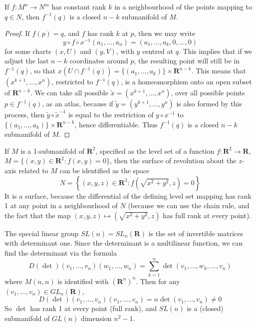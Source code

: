 \begin{theorem}
    If $f: M^n \to N^m$ has constant rank $k$ in a neighbourhood of the points mapping to $q \in N$, then $f^{-1}(q)$ is a closed $n - k$ submanifold of $M$.
\end{theorem}
\begin{proof}
    If $f(p) = q$, and $f$ has rank $k$ at $p$, then we may write
    \[ y \circ f \circ x^{-1}(a_1, \dots, a_n) = (a_1, \dots, a_k, 0 ,\dots, 0) \]
    for some charts $(x,U)$ and $(y,V)$, with $y$ centred at $q$. This implies that if we adjust the last $n - k$ coordinates around $p$, the resulting point will still be in $f^{-1}(q)$, so that $x(U \cap f^{-1}(q)) = \{ (a_1, \dots, a_k) \} \times \mathbf{R}^{n-k}$. This means that $(x^{k+1}, \dots, x^n)$, restricted to $f^{-1}(q)$, is a homeomorphism onto an open subset of $\mathbf{R}^{n-k}$. We can take all possible $\tilde{x} = (x^{k+1}, \dots, x^n)$, over all possible points $p \in f^{-1}(q)$, as an atlas, because if $\tilde{y} = (y^{k+1}, \dots, y^n)$ is also formed by this process, then $\tilde{y} \circ \tilde{x}^{-1}$ is equal to the restriction of $y \circ x^{-1}$ to $\{ (a_1, \dots, a_k) \} \times \mathbf{R}^{n-k}$, hence differentiable. Thus $f^{-1}(q)$ is a closed $n - k$ submanifold of $M$.
\end{proof}

\begin{example}
    If $M$ is a 1-submanifold of $\mathbf{R}^2$, specified as the level set of a function $f: \mathbf{R}^2 \to \mathbf{R}$, $M = \{ (x,y) \in \mathbf{R}^2: f(x,y) = 0 \}$, then the surface of revolution about the $z$-axis related to $M$ can be identified as the space
    \[ N = \left\{ (x,y,z) \in \mathbf{R}^3: f \left( \sqrt{x^2 + y^2}, z \right) = 0 \right\} \]
    It is a surface, because the differential of the defining level set mapping has rank 1 at any point in a neighbourhood of $N$ (because we can use the chain rule, and the fact that the map $(x,y,z) \mapsto (\sqrt{x^2 + y^2}, z)$ has full rank at every point).
\end{example}

\begin{example}
    The special linear group $SL(n) = SL_n(\mathbf{R})$ is the set of invertible matrices with determinant one. Since the determinant is a multilinear function, we can find the determinant via the formula
    \[ D(\det)(v_1, \dots, v_n)(w_1, \dots, w_n) = \sum_{k = 1}^n \det(v_1, \dots, w_k, \dots, v_n) \]
    where $M(n,n)$ is identified with $(\mathbf{R}^n)^n$. Then for any $(v_1, \dots, v_n) \in GL_n(\mathbf{R})$,
    \[ D(\det)(v_1, \dots, v_n)(v_1, \dots, v_n) = n \det(v_1, \dots, v_n) \neq 0 \]
    So $\det$ has rank 1 at every point (full rank), and $SL(n)$ is a (closed) submanifold of $GL(n)$ dimension $n^2 - 1$.
\end{example}

